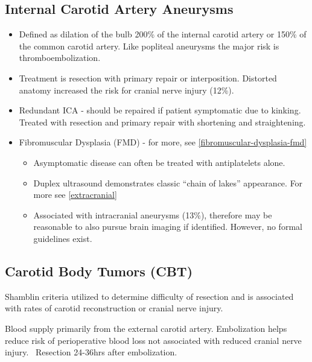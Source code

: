 \documentclass[
]{book}
\begin{document}
\hypertarget{internal-carotid-artery-aneurysms}{%
\subsection{Internal Carotid Artery Aneurysms}\label{internal-carotid-artery-aneurysms}}

\begin{itemize}
\item
  Defined as dilation of the bulb 200\% of the internal carotid artery
  or 150\% of the common carotid artery. Like popliteal aneurysms the
  major risk is thromboembolization.\citep{bush2019, fankhauser2015, pourier2018}
\item
  Treatment is resection with primary repair or interposition.
  Distorted anatomy increased the risk for cranial nerve injury
  (12\%).\citep{welleweerd2015}
\item
  Redundant ICA - should be repaired if patient symptomatic due to
  kinking. Treated with resection and primary repair with shortening
  and straightening.\citep{ballotta2005}
\item
  Fibromuscular Dysplasia (FMD)\citep{olin2011} - for more, see
  \ref{fibromuscular-dysplasia-fmd}

  \begin{itemize}
  \item
    Asymptomatic disease can often be treated with antiplatelets
    alone.
  \item
    Duplex ultrasound demonstrates classic ``chain of lakes''
    appearance. For more see \ref{extracranial}
  \item
    Associated with intracranial aneurysms (13\%), therefore may be
    reasonable to also pursue brain imaging if identified. However,
    no formal guidelines exist.\citep{lather2017}
  \end{itemize}
\end{itemize}

\hypertarget{carotid-body-tumors-cbt}{%
\subsection{Carotid Body Tumors (CBT)}\label{carotid-body-tumors-cbt}}

Shamblin criteria utilized to determine difficulty of resection and is
associated with rates of carotid reconstruction or cranial nerve injury.

Blood supply primarily from the external carotid artery.\citep{robertson2019, davila2016} Embolization helps reduce risk of perioperative blood loss
not associated with reduced cranial nerve injury.~ Resection 24-36hrs
after embolization.\citep{power2012}
\end{document}
